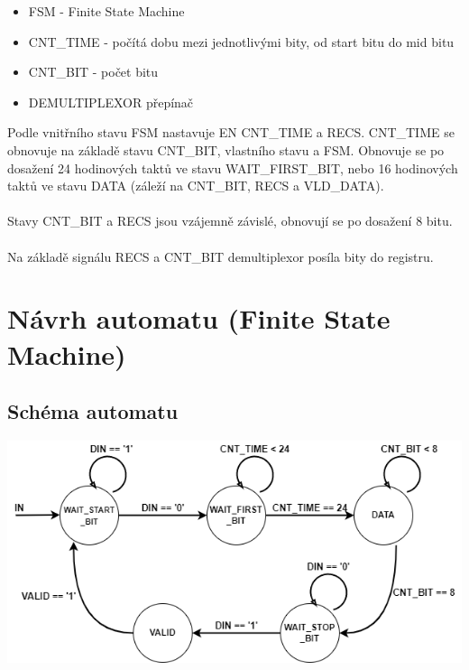 \documentclass[a4paper, 11pt]{article}
\begin{document}
	\begin{itemize}
	    \item FSM - Finite State Machine
	    \item CNT\_TIME - počítá dobu mezi jednotlivými bity, od start bitu do mid bitu
	    \item CNT\_BIT - počet bitu
	    \item DEMULTIPLEXOR přepínač
	\end{itemize}
	
	Podle vnitřního stavu FSM nastavuje EN CNT\_TIME a RECS. CNT\_TIME se obnovuje na základě stavu CNT\_BIT, vlastního stavu a FSM. Obnovuje se po dosažení 24 hodinových taktů ve stavu WAIT\_FIRST\_BIT, nebo 16 hodinových taktů ve stavu DATA (záleží na CNT\_BIT, RECS a VLD\_DATA).
	\\ \\
	Stavy CNT\_BIT a RECS jsou vzájemně závislé, obnovují se po dosažení 8 bitu.
	\\ \\
	Na základě signálu RECS a CNT\_BIT demultiplexor posíla bity do registru.
	
	
	
	
	
	\section{Návrh automatu (Finite State Machine)}
	\subsection{Schéma automatu}
	\begin{center}
	     \includegraphics[width=0.85\linewidth]{pic/1ONE.png} 
	\end{center}
	
	
	
	
	
\end{document}

